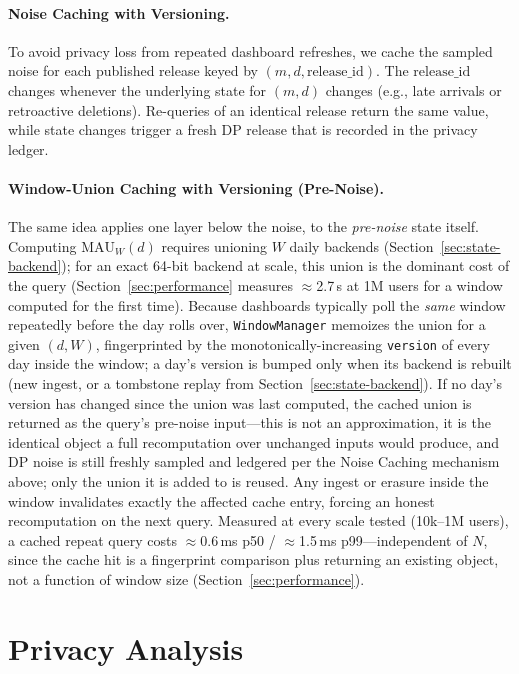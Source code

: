 \documentclass[sigconf,anonymous,review]{acmart}
\begin{document}
\paragraph{Noise Caching with Versioning.} To avoid privacy loss from repeated dashboard refreshes, we cache the sampled noise for each published release keyed by $(m, d, \text{release\_id})$. The $\text{release\_id}$ changes whenever the underlying state for $(m, d)$ changes (e.g., late arrivals or retroactive deletions). Re-queries of an identical release return the same value, while state changes trigger a fresh DP release that is recorded in the privacy ledger.

\paragraph{Window-Union Caching with Versioning (Pre-Noise).} The same idea applies one layer below the noise, to the \emph{pre-noise} state itself. Computing $\text{MAU}_W(d)$ requires unioning $W$ daily backends (Section~\ref{sec:state-backend}); for an exact 64-bit backend at scale, this union is the dominant cost of the query (Section~\ref{sec:performance} measures $\approx$2.7\,s at 1M users for a window computed for the first time). Because dashboards typically poll the \emph{same} window repeatedly before the day rolls over, \texttt{WindowManager} memoizes the union for a given $(d, W)$, fingerprinted by the monotonically-increasing \texttt{version} of every day inside the window; a day's version is bumped only when its backend is rebuilt (new ingest, or a tombstone replay from Section~\ref{sec:state-backend}). If no day's version has changed since the union was last computed, the cached union is returned as the query's pre-noise input---this is not an approximation, it is the identical object a full recomputation over unchanged inputs would produce, and DP noise is still freshly sampled and ledgered per the Noise Caching mechanism above; only the union it is added to is reused. Any ingest or erasure inside the window invalidates exactly the affected cache entry, forcing an honest recomputation on the next query. Measured at every scale tested (10k--1M users), a cached repeat query costs $\approx$0.6\,ms p50 / $\approx$1.5\,ms p99---independent of $N$, since the cache hit is a fingerprint comparison plus returning an existing object, not a function of window size (Section~\ref{sec:performance}).

\section{Privacy Analysis}
\label{sec:privacy-analysis}
\end{document}
